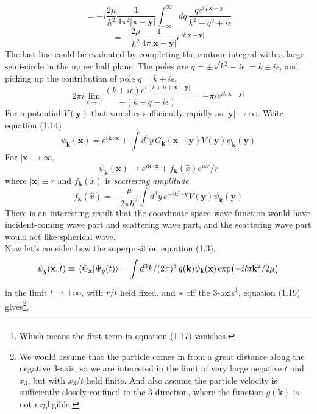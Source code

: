 \documentclass[12pt]{article}
\numberwithin{equation}{section}
\begin{document}
\[=-i\frac{2\mu}{\hbar^2}\frac{1}{4\pi^2|\mathbf{x}-\mathbf{y}|}\int_{-\infty}^{\infty}{dq\,\frac{qe^{iq|\mathbf{x}-\mathbf{y}|}}{k^2-q^2+i\epsilon}}\]
\begin{equation}
    =-\frac{2\mu}{\hbar^2}\frac{1}{4\pi|\mathbf{x}-\mathbf{y}|}e^{ik|\mathbf{x}-\mathbf{y}|}
\end{equation}
The last line could be evaluated by completing the contour integral with a large semi-circle in the upper half plane.
The poles are $q = \pm\sqrt{k^2-i\epsilon} = k\pm i\epsilon$, and picking up the contribution of pole $q = k+i\epsilon$.
\[2\pi i\lim_{\epsilon\rightarrow0}\frac{(k+i\epsilon)e^{i(k+i\epsilon)|\mathbf{x}-\mathbf{y}|}}{-(k+q+i\epsilon)} = -\pi ie^{ik|\mathbf{x}-\mathbf{y}|}\]
For a potential $V(\mathbf{y})$ that vanishes sufficiently rapidly as $|\mathbf{y}|\rightarrow\infty$.
Write equation (1.14)
\begin{equation}
    \psi_{\mathbf{k}}(\mathbf{x}) = e^{i\mathbf{k}\cdot\mathbf{x}} + \int{d^3y\,G_{\mathbf{k}}(\mathbf{x}-\mathbf{y})V(\mathbf{y})\psi_{\mathbf{k}}(\mathbf{y})}
\end{equation}
For $|\mathbf{x}|\rightarrow\infty$,
\begin{equation}
    \psi_{\mathbf{k}}(\mathbf{x})\rightarrow e^{i\mathbf{k}\cdot\mathbf{x}}+f_{\mathbf{k}}(\hat{x})e^{ikr}/r
\end{equation}
where $|\mathbf{x}|\equiv r$ and $f_{\mathbf{k}}(\hat{x})$ is \textit{scattering amplitude}.
\begin{equation}
    f_{\mathbf{k}}(\hat{x}) = -\frac{\mu}{2\pi\hbar^2}\int{d^3y\,e^{-ik\hat{x}\cdot\mathbf{y}}V(\mathbf{y})\psi_{\mathbf{k}}(\mathbf{y})}
\end{equation}
There is an interesting result that the coordinate-space wave function would have incident-coming wave part and scattering wave part, and the scattering wave part would act like spherical wave.
\\\indent Now let's consider how the superposition equation (1.3),
\begin{equation}
    \psi_{g}(\mathbf{x}, t)\equiv\braket*{\Phi_{\mathbf{x}}}{\Psi_{g}(t)} = \int{d^3k/(2\pi)^3\,g(\mathbf{k})\psi_{\mathbf{k}}(\mathbf{x})\exp(-i\hbar t\mathbf{k}^2/2\mu)}
\end{equation}
in the limit $t\rightarrow+\infty$, with $r/t$ held fixed, and $\mathbf{x}$ off the 3-axis\footnote{Which means the first term in equation (1.17) vanishes.}, equation (1.19) gives\footnote{We would assume that the particle comes in from a great distance along the negative 3-axis, so we are interested in the limit of very large negative $t$ and $x_3$, but with $x_3/t$ held finite. And also assume the particle velocity is sufficiently closely confined to the 3-direction, where the function $g(\mathbf{k})$ is not negligible.},
\end{document}
